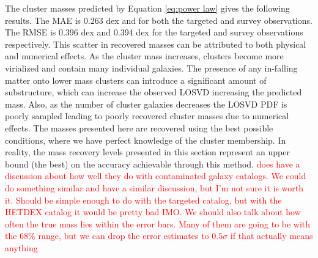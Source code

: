 \documentclass[fleqn,usenatbib]{mnras}
\newcommand{\editorial}[1]{\textcolor{red}{#1}}
\begin{document}
The cluster masses predicted by Equation \ref{eq:power law} gives the following results. The MAE is 0.263 dex and for both the targeted and survey observations. The RMSE is 0.396 dex and 0.394 dex for the targeted and survey observations respectively. This scatter in recovered masses can be attributed to both physical and numerical effects. As the cluster mass increases, clusters become more virialized and contain many individual galaxies. The presence of any in-falling matter onto lower mass clusters can introduce a significant amount of substructure, which can increase the observed LOSVD increasing the predicted mass. Also, as the number of cluster galaxies decreases the LOSVD PDF is poorly sampled leading to poorly recovered cluster masses due to numerical effects. The masses presented here are recovered using the best possible conditions, where we have perfect knowledge of the cluster membership. In reality, the mass recovery levels presented in this section represent an upper bound (the best) on the accuracy achievable through this method. \editorial{\cite{Ntampaka2015} does have a discussion about how well they do with contaminated galaxy catalogs. We could do something similar and have a similar discussion, but I'm not sure it is worth it. Should be simple enough to do with the targeted catalog, but with the HETDEX catalog it would be pretty bad IMO. We should also talk about how often the true mass lies within the error bars. Many of them are going to be with the 68\% range, but we can drop the error estimates to $0.5\sigma$ if that actually means anything} 
\end{document}
